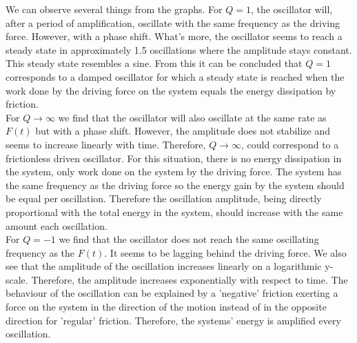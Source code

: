 We can observe several things from the graphs. For $Q = 1$, the oscillator will, after a period of amplification, oscillate with the same frequency as the driving force. However, with a phase shift. What's more, the oscillator seems to reach a steady state in approximately 1.5 oscillations where the amplitude stays constant. This steady state resembles a sine. From this it can be concluded that $Q = 1$ corresponds to a damped oscillator for which a steady state is reached when the work done by the driving force on the system equals the energy dissipation by friction. \\
For $Q \rightarrow \infty$ we find that the oscillator will also oscillate at the same rate as $F(t)$ but with a phase shift. However, the amplitude does not stabilize and seems to increase linearly with time. Therefore, $Q \rightarrow \infty$, could  correspond to a frictionless driven oscillator. For this situation, there is no energy dissipation in the system, only  work done on the system by the driving force. The system has the same frequency as the driving force so the energy gain by the system should be equal per oscillation. Therefore the oscillation amplitude, being directly proportional with the total energy in the system, should increase with the same amount each oscillation. \\
For $Q = -1$ we find that the oscillator does not reach the same oscillating frequency as the $F(t)$. It seems to be lagging behind the driving force. We also see that the amplitude of the oscillation increases linearly on a logarithmic y-scale. Therefore, the amplitude increases exponentially with respect to time. The behaviour of the oscillation can be explained by a 'negative' friction exerting a force on the system in the direction of the motion instead of in the opposite direction for 'regular' friction. Therefore, the systems' energy is amplified every oscillation.